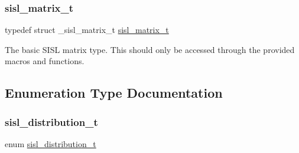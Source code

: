 \subsubsection{\texorpdfstring{sisl\+\_\+matrix\+\_\+t}{sisl\_matrix\_t}}
{\footnotesize\ttfamily typedef struct \+\_\+sisl\+\_\+matrix\+\_\+t \mbox{\hyperlink{group__matrix_gad147923587b355644defb9bfbf981740}{sisl\+\_\+matrix\+\_\+t}}}

The basic S\+I\+SL matrix type. This should only be accessed through the provided macros and functions. 

\subsection{Enumeration Type Documentation}
\mbox{\label{group__matrix_ga03fd8bd724705cd998bb37b51393c0d4}} 
\subsubsection{\texorpdfstring{sisl\+\_\+distribution\+\_\+t}{sisl\_distribution\_t}}
{\footnotesize\ttfamily enum \mbox{\hyperlink{group__matrix_ga03fd8bd724705cd998bb37b51393c0d4}{sisl\+\_\+distribution\+\_\+t}}}

